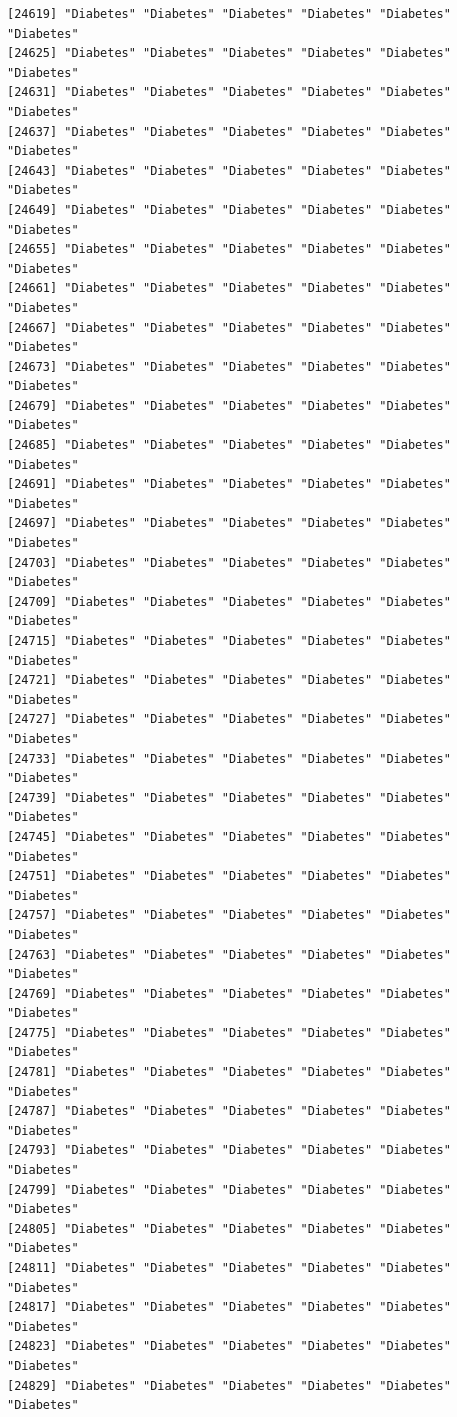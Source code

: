 \documentclass[
  letterpaper,
  DIV=11,
  numbers=noendperiod]{scrartcl}
\begin{document}
\begin{verbatim}
[24619] "Diabetes" "Diabetes" "Diabetes" "Diabetes" "Diabetes" "Diabetes"
[24625] "Diabetes" "Diabetes" "Diabetes" "Diabetes" "Diabetes" "Diabetes"
[24631] "Diabetes" "Diabetes" "Diabetes" "Diabetes" "Diabetes" "Diabetes"
[24637] "Diabetes" "Diabetes" "Diabetes" "Diabetes" "Diabetes" "Diabetes"
[24643] "Diabetes" "Diabetes" "Diabetes" "Diabetes" "Diabetes" "Diabetes"
[24649] "Diabetes" "Diabetes" "Diabetes" "Diabetes" "Diabetes" "Diabetes"
[24655] "Diabetes" "Diabetes" "Diabetes" "Diabetes" "Diabetes" "Diabetes"
[24661] "Diabetes" "Diabetes" "Diabetes" "Diabetes" "Diabetes" "Diabetes"
[24667] "Diabetes" "Diabetes" "Diabetes" "Diabetes" "Diabetes" "Diabetes"
[24673] "Diabetes" "Diabetes" "Diabetes" "Diabetes" "Diabetes" "Diabetes"
[24679] "Diabetes" "Diabetes" "Diabetes" "Diabetes" "Diabetes" "Diabetes"
[24685] "Diabetes" "Diabetes" "Diabetes" "Diabetes" "Diabetes" "Diabetes"
[24691] "Diabetes" "Diabetes" "Diabetes" "Diabetes" "Diabetes" "Diabetes"
[24697] "Diabetes" "Diabetes" "Diabetes" "Diabetes" "Diabetes" "Diabetes"
[24703] "Diabetes" "Diabetes" "Diabetes" "Diabetes" "Diabetes" "Diabetes"
[24709] "Diabetes" "Diabetes" "Diabetes" "Diabetes" "Diabetes" "Diabetes"
[24715] "Diabetes" "Diabetes" "Diabetes" "Diabetes" "Diabetes" "Diabetes"
[24721] "Diabetes" "Diabetes" "Diabetes" "Diabetes" "Diabetes" "Diabetes"
[24727] "Diabetes" "Diabetes" "Diabetes" "Diabetes" "Diabetes" "Diabetes"
[24733] "Diabetes" "Diabetes" "Diabetes" "Diabetes" "Diabetes" "Diabetes"
[24739] "Diabetes" "Diabetes" "Diabetes" "Diabetes" "Diabetes" "Diabetes"
[24745] "Diabetes" "Diabetes" "Diabetes" "Diabetes" "Diabetes" "Diabetes"
[24751] "Diabetes" "Diabetes" "Diabetes" "Diabetes" "Diabetes" "Diabetes"
[24757] "Diabetes" "Diabetes" "Diabetes" "Diabetes" "Diabetes" "Diabetes"
[24763] "Diabetes" "Diabetes" "Diabetes" "Diabetes" "Diabetes" "Diabetes"
[24769] "Diabetes" "Diabetes" "Diabetes" "Diabetes" "Diabetes" "Diabetes"
[24775] "Diabetes" "Diabetes" "Diabetes" "Diabetes" "Diabetes" "Diabetes"
[24781] "Diabetes" "Diabetes" "Diabetes" "Diabetes" "Diabetes" "Diabetes"
[24787] "Diabetes" "Diabetes" "Diabetes" "Diabetes" "Diabetes" "Diabetes"
[24793] "Diabetes" "Diabetes" "Diabetes" "Diabetes" "Diabetes" "Diabetes"
[24799] "Diabetes" "Diabetes" "Diabetes" "Diabetes" "Diabetes" "Diabetes"
[24805] "Diabetes" "Diabetes" "Diabetes" "Diabetes" "Diabetes" "Diabetes"
[24811] "Diabetes" "Diabetes" "Diabetes" "Diabetes" "Diabetes" "Diabetes"
[24817] "Diabetes" "Diabetes" "Diabetes" "Diabetes" "Diabetes" "Diabetes"
[24823] "Diabetes" "Diabetes" "Diabetes" "Diabetes" "Diabetes" "Diabetes"
[24829] "Diabetes" "Diabetes" "Diabetes" "Diabetes" "Diabetes" "Diabetes"

\end{verbatim}
\end{document}
